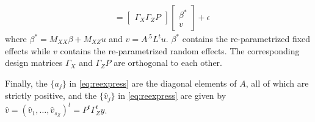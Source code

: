 \documentclass{report}
\begin{document}
\begin{enumerate}
\begin{equation*}
\begin{split}
        &= \begin{bmatrix} \Gamma_X \Gamma_ZP \end{bmatrix} \begin{bmatrix} \beta^* \\ v \end{bmatrix} + \epsilon
      \end{split}
    \end{equation*}
    where $\beta^* = M_{XX}\beta + M_{XZ}u$ and $v = A^{.5}L^t u$.  $\beta^*$ contains the re-parametrized
    fixed effects while $v$ contains the re-parametrized random effects.  The corresponding design matrices
    $\Gamma_X$ and $\Gamma_Z P$ are orthogonal to each other.
\end{enumerate}
Finally, the $\{a_j\}$ in \eqref{eq:reexpress} are the diagonal elements of $A$, all of which are strictly positive, and the $\{\hat v_j\}$ in \eqref{eq:reexpress} are given by $\hat v = (\hat v_1, \dots, \hat v_{s_Z})^t = P^t \Gamma_Z^t y$.



\end{document}
